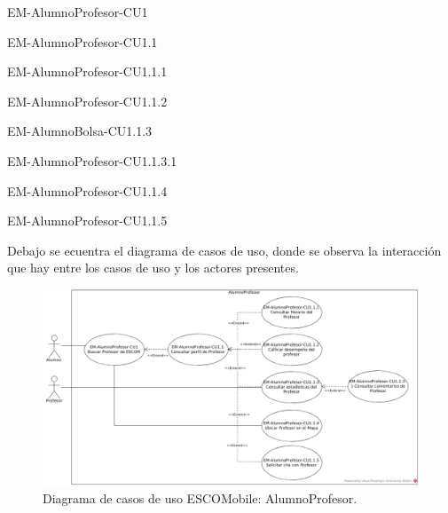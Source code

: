 \begin{requisitos}{EM-AlumnoProfesor-CU1}
\end{requisitos}

\begin{requisitos}{EM-AlumnoProfesor-CU1.1}
\end{requisitos}

\begin{requisitos}{EM-AlumnoProfesor-CU1.1.1}
\end{requisitos}

\begin{requisitos}{EM-AlumnoProfesor-CU1.1.2}
\end{requisitos}

\begin{requisitos}{EM-AlumnoBolsa-CU1.1.3}
\end{requisitos}

\begin{requisitos}{EM-AlumnoProfesor-CU1.1.3.1}
\end{requisitos}

\begin{requisitos}{EM-AlumnoProfesor-CU1.1.4}
\end{requisitos}

\begin{requisitos}{EM-AlumnoProfesor-CU1.1.5}
\end{requisitos}

\noindent
Debajo se ecuentra el diagrama de casos de uso, donde se observa la interacción que hay
entre los casos de uso y los actores presentes.

\pagebreak
\begin{figure}[htbp!]
	\centering
	\includegraphics[width=1\textwidth]{images/casos/alumnoProfesor}
	\caption{Diagrama de casos de uso ESCOMobile: AlumnoProfesor.}
\end{figure}


